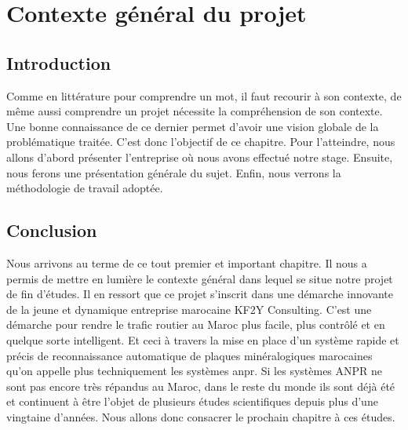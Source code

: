 \chapter{\textbf{Contexte général du projet}}

\section{Introduction}

Comme en littérature pour comprendre un mot, il faut recourir à son contexte, de même aussi comprendre un projet nécessite la compréhension de son contexte. Une bonne connaissance de ce dernier permet d’avoir une vision globale de la problématique traitée. C’est donc l’objectif de ce chapitre. Pour l’atteindre, nous allons d’abord présenter l’entreprise où nous avons effectué notre stage. Ensuite, nous ferons une présentation générale du sujet. Enfin, nous verrons la méthodologie de travail adoptée.





\section{Conclusion}
Nous arrivons au terme de ce tout premier et important chapitre. Il nous a permis de mettre en lumière le contexte général dans lequel se situe notre projet de fin d’études. Il en ressort que ce projet s’inscrit dans une démarche innovante de la jeune et dynamique entreprise marocaine KF2Y Consulting. C’est une démarche pour rendre le trafic routier au Maroc plus facile, plus contrôlé et en quelque sorte intelligent. Et ceci à travers la mise en place d’un système rapide et précis de reconnaissance automatique de plaques minéralogiques marocaines qu'on appelle plus techniquement les systèmes \acrshort{anpr}. Si les systèmes ANPR ne sont pas encore très répandus au Maroc, dans le reste du monde ils sont déjà été et continuent à être l'objet de plusieurs études scientifiques depuis plus d’une vingtaine d’années. Nous allons donc consacrer le prochain chapitre à ces études.